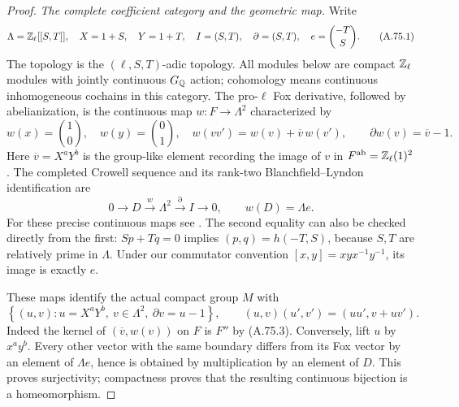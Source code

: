 \begin{proof}
\emph{The complete coefficient category and the geometric map.}
Write
\[
 \Lambda=\mathbb Z_\ell[[S,T]],\quad X=1+S,\quad Y=1+T,\quad
 I=(S,T),\quad \partial=(S,T),\quad
 e=\binom{-T}{S}.
 \tag{A.75.1}
\]
The topology is the $(\ell,S,T)$-adic topology.  All modules below
are compact $\mathbb Z_\ell$ modules with jointly continuous $G_\mathbb Q$
action; cohomology means continuous inhomogeneous cochains in
this category.
The pro-$\ell$ Fox derivative, followed by abelianization, is
the continuous map
$w:F\to\Lambda^2$ characterized by
\[
 w(x)=\binom10,\quad w(y)=\binom01,\quad
 w(vv')=w(v)+\overline v\,w(v'),\qquad
                   \partial w(v)=\overline v-1 .
 \tag{A.75.2}
\]
Here $\overline v=X^aY^b$ is the group-like element recording
the image of $v$ in $F^{\rm ab}=\mathbb Z_\ell(1)^2$.
The completed Crowell sequence and its rank-two
Blanchfield--Lyndon identification are
\[
 0\longrightarrow D\xrightarrow{\,w\,}\Lambda^2
       \xrightarrow{\partial}I\longrightarrow0,\qquad
                    w(D)=\Lambda e .
 \tag{A.75.3}
\]
For these precise continuous maps see
\cite[(5.3.5)--(5.3.6), Proposition 5.3.7, and Lemma 7.1.1]
{BIR_KodaniMorishitaTerashima2017}.
The second equality can also be checked directly from the first:
$Sp+Tq=0$ implies $(p,q)=h(-T,S)$, because $S,T$ are
relatively prime in $\Lambda$.
Under our commutator convention
$[x,y]=xyx^{-1}y^{-1}$, its image is exactly $e$.

These maps identify the actual compact group $M$ with
\[
 \left\{(u,v):
    u=X^aY^b,\ v\in\Lambda^2,\ \partial v=u-1\right\},
 \qquad
 (u,v)(u',v')=(uu',v+uv').
 \tag{A.75.4}
\]
Indeed the kernel of $(\overline v,w(v))$ on $F$ is $F''$
by (A.75.3).  Conversely, lift $u$ by $x^ay^b$.
Every other vector with the same boundary differs from its Fox
vector by an element of $\Lambda e$, hence is obtained by
multiplication by an element of $D$.
This proves surjectivity; compactness proves that the resulting
continuous bijection is a homeomorphism.


\end{proof}
